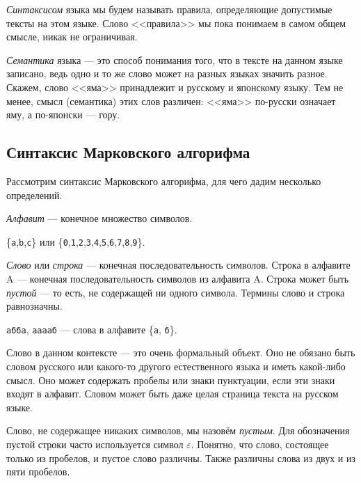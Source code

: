 \documentclass[12pt,a4paper,oneside]{article}
\newcommand{\s}[1]{\texttt{#1}}
\begin{document}
\emph{Синтаксисом} языка мы будем называть правила, определяющие допустимые
тексты на этом языке. Слово <<правила>> мы пока понимаем в самом общем 
смысле, никак не ограничивая.

\emph{Семантика} языка --- это способ понимания того, 
что в тексте на данном языке записано, ведь одно и то же слово может на 
разных языках значить разное. 
Скажем, слово <<яма>> принадлежит и русскому и японскому языку.
 Тем не менее, смысл (семантика) 
этих слов различен: <<яма>> по-русски означает яму, а по-японски --- гору. 

\subsection{Синтаксис Марковского алгорифма}

Рассмотрим синтаксис Марковского алгорифма, для чего дадим несколько 
определений.

\begin{definition}
\emph{Алфавит} --- конечное множество символов. 
\end{definition}
\begin{example} \{\s{a},\s{b},\s{c}\}
или \{\s{0},\s{1},\s{2},\s{3},\s{4},\s
{5},\s{6},\s{7},\s{8},\s{9}\}.
\end{example}

\begin{definition}
\emph{Слово} или \emph{строка} --- конечная последовательность символов. Строка в 
алфавите A --- конечная последовательность символов из алфавита A. Строка может
быть \emph{пустой} --- то есть, не содержащей ни одного символа. 
Термины слово и строка равнозначны. 
\end{definition}

\begin{example}
\s{абба}, \s {ааааб} --- слова в алфавите \{\s{а},
\s{б}\}. 
\end{example}

Слово в данном контексте --- это очень формальный объект. Оно не обязано быть 
словом русского или какого-то другого естественного языка и иметь какой-либо 
смысл. Оно может содержать пробелы или знаки пунктуации, если эти знаки 
входят в алфавит. Словом может быть даже целая страница текста на русском 
языке. 

Слово, не содержащее никаких символов, мы назовём \emph{пустым}.
Для обозначения пустой строки часто используется символ $\varepsilon$.
Понятно, что слово, состоящее только из пробелов, и пустое слово различны.
Также различны слова из двух и из пяти пробелов.
\end{document}
